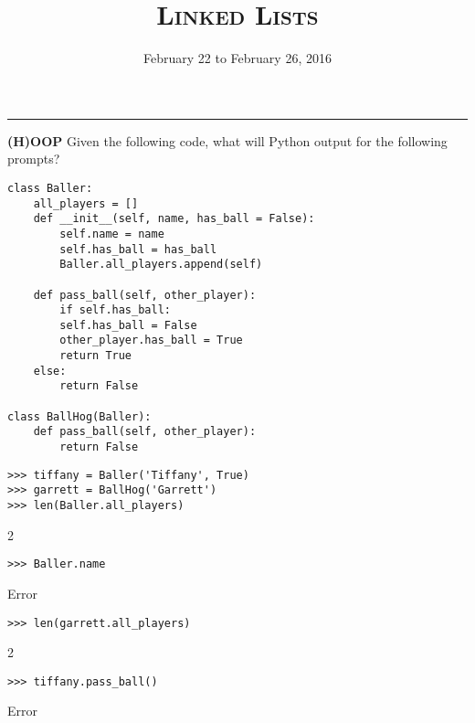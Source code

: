\documentclass{exam}
\title{\textsc{Linked Lists}}
\date{February 22 to February 26, 2016}
\begin{document}
\maketitle
\rule{\textwidth}{0.15em}
\fontsize{12}{15}\selectfont




\begin{questions}
\begin{blocksection}
\question \textbf{(H)OOP} Given the following code, what will Python output for the following prompts? 

\begin{lstlisting}
class Baller:
	all_players = []
	def __init__(self, name, has_ball = False):
		self.name = name
		self.has_ball = has_ball
		Baller.all_players.append(self)
	
	def pass_ball(self, other_player):
		if self.has_ball:
		self.has_ball = False
		other_player.has_ball = True
		return True
	else:
		return False

class BallHog(Baller):
	def pass_ball(self, other_player):	
		return False	
\end{lstlisting}

\begin{lstlisting}
>>> tiffany = Baller('Tiffany', True)
>>> garrett = BallHog('Garrett')
>>> len(Baller.all_players)
\end{lstlisting}
\begin{solution}[.2in]
2
\end{solution}

\begin{lstlisting}
>>> Baller.name
\end{lstlisting}
\begin{solution}[.2in]
Error
\end{solution}

\begin{lstlisting}
>>> len(garrett.all_players)
\end{lstlisting}
\begin{solution}[.2in]
2
\end{solution}
\end{blocksection}

\begin{blocksection}
\begin{lstlisting}
>>> tiffany.pass_ball()
\end{lstlisting}
\begin{solution}[.2in]
Error
\end{solution}


\end{blocksection}
\end{questions}
\end{document}
